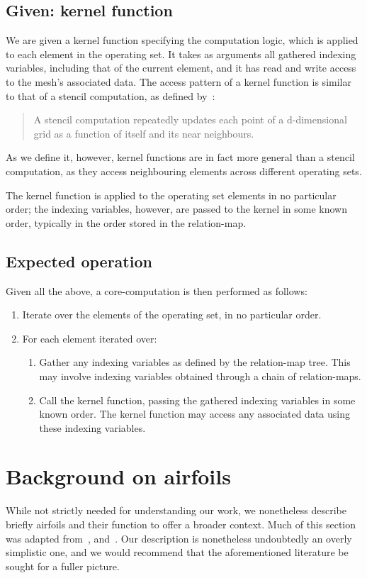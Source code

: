 \subsection{Given: kernel function}
\label{subsec:given-kernel-function}
We are given a kernel function specifying the computation logic, which is applied to each element in the operating set. It takes as arguments all gathered indexing variables, including that of the current element, and it has read and write access to the mesh's associated data. The access pattern of a kernel function is similar to that of a stencil computation, as defined by~\cite{tang2011pochoir}:
\begin{quote}
A stencil computation repeatedly updates each point of a d-dimensional grid as a function of itself and its near neighbours.
\end{quote}
As we define it, however, kernel functions are in fact more general than a stencil computation, as they access neighbouring elements across different operating sets.


The kernel function is applied to the operating set elements in no particular order; the indexing variables, however, are passed to the kernel in some known order, typically in the order stored in the relation-map.


\subsection{Expected operation}
Given all the above, a core-computation is then performed as follows:
\begin{enumerate}
\item Iterate over the elements of the operating set, in no particular order.
\item For each element iterated over:
    \begin{enumerate}
    \item Gather any indexing variables as defined by the relation-map tree. This may involve indexing variables obtained through a chain of relation-maps.
    \item Call the kernel function, passing the gathered indexing variables in some known order. The kernel function may access any associated data using these indexing variables.
    \end{enumerate}
\end{enumerate}



\section{Background on airfoils}
While not strictly needed for understanding our work, we nonetheless describe briefly airfoils and their function to offer a broader context. Much of this section was adapted from~\cite{abbott2012theory}, \cite{kuethe1986foundations} and~\cite{boeing2014airfoil}. Our description is nonetheless undoubtedly an overly simplistic one, and we would recommend that the aforementioned literature be sought for a fuller picture.

